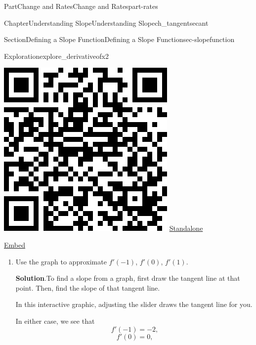 \documentclass[oneside,10pt,]{tufte-book}
\newcommand{\blocktitlefont}{\relax}
\numberwithin{equation}{chapter}
\begin{document}
\begin{partptx}{Part}{Change and Rates}{}{Change and Rates}{}{}{part-rates}
\begin{chapterptx}{Chapter}{Understanding Slope}{}{Understanding Slope}{}{}{ch_tangentsecant}
\begin{sectionptx}{Section}{Defining a Slope Function}{}{Defining a Slope Function}{}{}{sec-slopefunction}
\begin{exploration}{Exploration}{}{explore_derivativeofx2}
\begin{sidebyside}{2}{0.075}{0.075}{0.17}
\begin{sbspanel}{0.21}
\includegraphics[width=\linewidth]{generated/qrcode/explore_derivativeofx2-1-1-2.png}
\href{http://webwork.bridgew.edu/oer/functions_at_work/explore_derivativeofx2-1-1-2.html}{Standalone}%
\par
\href{http://webwork.bridgew.edu/oer/functions_at_work/explore_derivativeofx2-1-1-2-if.html}{Embed}%
\end{sbspanel}%
\end{sidebyside}%
%
\begin{enumerate}[font=\bfseries,label=(\alph*),ref=\alph*]%
\item{}Use the graph to approximate \(f'(-1)\), \(f'(0)\), \(f'(1)\).%
\par\smallskip%
\noindent\textbf{\blocktitlefont Solution}.\hypertarget{explore_derivativeofx2-2-2}{}\quad{}To find a slope from a graph, first draw the tangent line at that point. Then, find the slope of that tangent line.%
\par
In this interactive graphic, adjusting the slider draws the tangent line for you.%
\par
In either case, we see that%
\begin{equation*}
f'(-1) = -2\text{,}
\end{equation*}
%
\begin{equation*}
f'(0)=0\text{,}
\end{equation*}

\end{enumerate}
\end{exploration}
\end{sectionptx}
\end{chapterptx}
\end{partptx}
\end{document}
